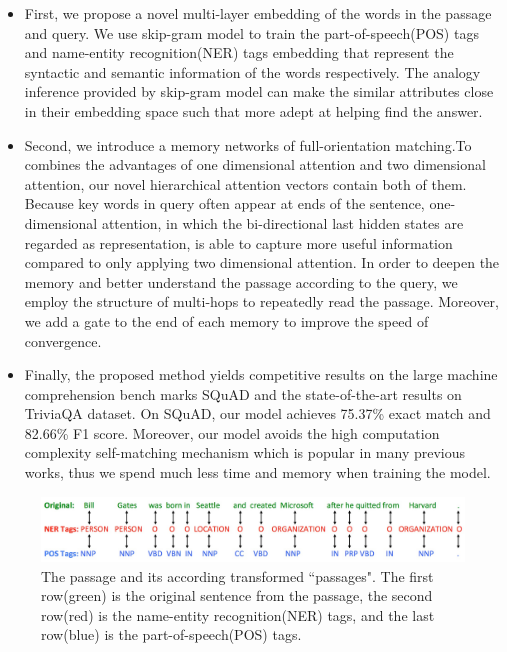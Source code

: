 \documentclass[letterpaper]{article}
\begin{document}
\begin{itemize}
\item First, we propose a novel multi-layer embedding of the words in the passage and query. We use skip-gram model to train the part-of-speech(POS) tags and name-entity recognition(NER) tags embedding that represent the syntactic and semantic information of the words respectively. The analogy inference provided by  skip-gram model can make the similar attributes close in their embedding space such that more adept at helping find the answer.

\item Second, we introduce a memory networks of full-orientation matching.To combines the advantages of one dimensional attention and two dimensional attention, our novel hierarchical attention vectors contain both of them. Because key words in query often appear at ends of the sentence, one-dimensional attention, in which the bi-directional last hidden states are regarded as representation, is able to capture more useful information compared to only applying two dimensional attention. In order to deepen the memory and  better understand the passage according to the query, we employ the structure of multi-hops to repeatedly read the passage. Moreover, we add a gate to the end of each memory to improve the speed of convergence.

\item Finally, the proposed method yields competitive results on the large machine comprehension bench marks SQuAD and the state-of-the-art results on TriviaQA dataset. On SQuAD, our model achieves 75.37\% exact match and 82.66\% F1 score. Moreover, our model avoids the high computation complexity self-matching mechanism which is popular in many previous works, thus we spend much less time and memory when training the model. 

\end{itemize}

\begin{figure}[htbp]
  \begin{center}
  \includegraphics[width=0.8 \textwidth]{memen_embedding.jpg}
  \caption{The passage and its according transformed ``passages". The first row(green) is the original sentence from the passage, the second row(red) is the name-entity recognition(NER) tags, and the last row(blue) is the part-of-speech(POS) tags.}
  \end{center}
\end{figure}
\end{document}

